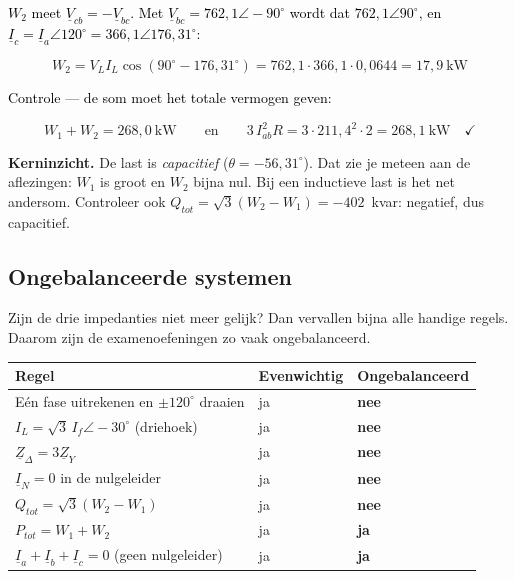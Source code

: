 \documentclass[a4paper,11pt]{article}
\newcommand{\stapreden}[1]{\par\vspace{1.4mm}\noindent\textcolor{black}{#1}\par\vspace{-2mm}}
\begin{document}
\begin{oefening}
    \stapreden{$W_2$ meet $\underline{V}_{cb} = -\underline{V}_{bc}$. Met $\underline{V}_{bc} = 762{,}1\angle -90^\circ$ wordt dat $762{,}1\angle 90^\circ$, en $\underline{I}_c = \underline{I}_a\angle 120^\circ = 366{,}1\angle 176{,}31^\circ$:}
    \[W_2 = V_L I_L \cos(90^\circ - 176{,}31^\circ) = 762{,}1\cdot 366{,}1\cdot 0{,}0644
        = \boxed{17{,}9\ \text{kW}}\]

    \stapreden{Controle --- de som moet het totale vermogen geven:}
    \[W_1 + W_2 = 268{,}0\ \text{kW}
        \qquad\text{en}\qquad
        3\,I_{ab}^2 R = 3\cdot 211{,}4^2 \cdot 2 = 268{,}1\ \text{kW} \quad\checkmark\]

    \textbf{Kerninzicht.} De last is \emph{capacitief} ($\theta = -56{,}31^\circ$). Dat zie je meteen
    aan de aflezingen: $W_1$ is groot en $W_2$ bijna nul. Bij een inductieve last is het net
    andersom. Controleer ook $Q_{tot} = \sqrt{3}(W_2 - W_1) = -402$~kvar: negatief, dus capacitief.
\end{oefening}

\subsection{Ongebalanceerde systemen}

Zijn de drie impedanties niet meer gelijk? Dan vervallen bijna alle handige regels. Daarom zijn de
examenoefeningen zo vaak ongebalanceerd.

\begin{center}
    \begin{tabular}{@{}p{62mm}p{20mm}p{28mm}@{}}
        \toprule
        \textbf{Regel}                                   & \textbf{Evenwichtig} & \textbf{Ongebalanceerd} \\
        \midrule
        Eén fase uitrekenen en $\pm120^\circ$ draaien    & ja                   & \textbf{nee}            \\
        $I_L = \sqrt{3}\,I_f\angle -30^\circ$ (driehoek) & ja                   & \textbf{nee}            \\
        $\underline{Z}_\Delta = 3\underline{Z}_Y$        & ja                   & \textbf{nee}            \\
        $\underline{I}_N = 0$ in de nulgeleider          & ja                   & \textbf{nee}            \\
        $Q_{tot} = \sqrt{3}(W_2 - W_1)$                  & ja                   & \textbf{nee}            \\
        $P_{tot} = W_1 + W_2$                            & ja                   & \textbf{ja}             \\
        $\underline{I}_a+\underline{I}_b+\underline{I}_c = 0$ (geen nulgeleider)
                                                         & ja                   & \textbf{ja}             \\
        \bottomrule
    \end{tabular}
\end{center}
\end{document}
